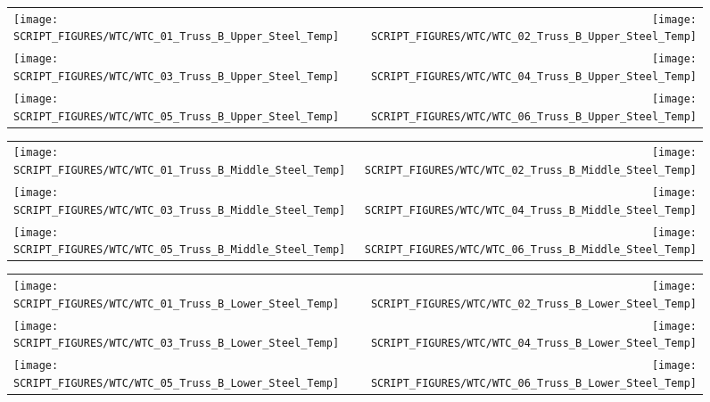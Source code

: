 \begin{figure}[!ht]
\begin{tabular*}{\textwidth}{l@{\extracolsep{\fill}}r}
\texttt{[image: SCRIPT\_FIGURES/WTC/WTC\_01\_Truss\_B\_Upper\_Steel\_Temp]} &
\texttt{[image: SCRIPT\_FIGURES/WTC/WTC\_02\_Truss\_B\_Upper\_Steel\_Temp]} \\
\texttt{[image: SCRIPT\_FIGURES/WTC/WTC\_03\_Truss\_B\_Upper\_Steel\_Temp]} &
\texttt{[image: SCRIPT\_FIGURES/WTC/WTC\_04\_Truss\_B\_Upper\_Steel\_Temp]} \\
\texttt{[image: SCRIPT\_FIGURES/WTC/WTC\_05\_Truss\_B\_Upper\_Steel\_Temp]} &
\texttt{[image: SCRIPT\_FIGURES/WTC/WTC\_06\_Truss\_B\_Upper\_Steel\_Temp]}
\end{tabular*}
\label{NIST_WTC_Truss_B_Upper_Steel_Temp}
\end{figure}

\begin{figure}[!ht]
\begin{tabular*}{\textwidth}{l@{\extracolsep{\fill}}r}
\texttt{[image: SCRIPT\_FIGURES/WTC/WTC\_01\_Truss\_B\_Middle\_Steel\_Temp]} &
\texttt{[image: SCRIPT\_FIGURES/WTC/WTC\_02\_Truss\_B\_Middle\_Steel\_Temp]} \\
\texttt{[image: SCRIPT\_FIGURES/WTC/WTC\_03\_Truss\_B\_Middle\_Steel\_Temp]} &
\texttt{[image: SCRIPT\_FIGURES/WTC/WTC\_04\_Truss\_B\_Middle\_Steel\_Temp]} \\
\texttt{[image: SCRIPT\_FIGURES/WTC/WTC\_05\_Truss\_B\_Middle\_Steel\_Temp]} &
\texttt{[image: SCRIPT\_FIGURES/WTC/WTC\_06\_Truss\_B\_Middle\_Steel\_Temp]}
\end{tabular*}
\label{NIST_WTC_Truss_B_Middle_Steel_Temp}
\end{figure}

\begin{figure}[!ht]
\begin{tabular*}{\textwidth}{l@{\extracolsep{\fill}}r}
\texttt{[image: SCRIPT\_FIGURES/WTC/WTC\_01\_Truss\_B\_Lower\_Steel\_Temp]} &
\texttt{[image: SCRIPT\_FIGURES/WTC/WTC\_02\_Truss\_B\_Lower\_Steel\_Temp]} \\
\texttt{[image: SCRIPT\_FIGURES/WTC/WTC\_03\_Truss\_B\_Lower\_Steel\_Temp]} &
\texttt{[image: SCRIPT\_FIGURES/WTC/WTC\_04\_Truss\_B\_Lower\_Steel\_Temp]} \\
\texttt{[image: SCRIPT\_FIGURES/WTC/WTC\_05\_Truss\_B\_Lower\_Steel\_Temp]} &
\texttt{[image: SCRIPT\_FIGURES/WTC/WTC\_06\_Truss\_B\_Lower\_Steel\_Temp]}
\end{tabular*}
\label{NIST_WTC_Truss_B_Lower_Steel_Temp}
\end{figure}



